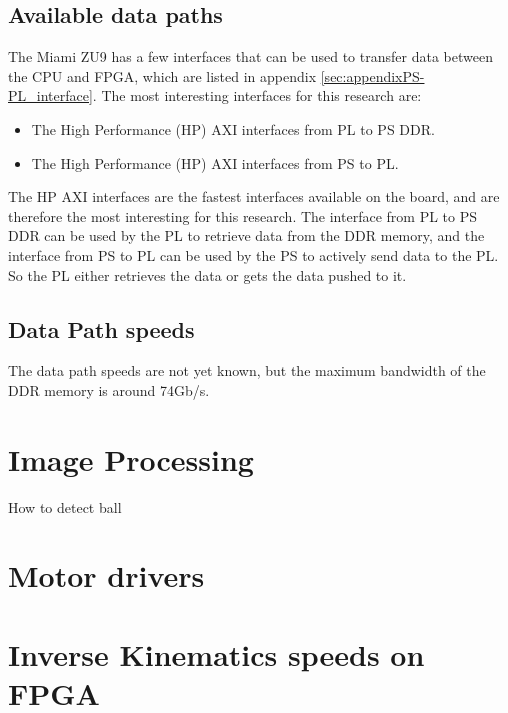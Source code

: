 \documentclass{article}
\begin{document}
\subsection{Available data paths}
The Miami ZU9 has a few interfaces that can be used to transfer data between the CPU and FPGA, which are listed in appendix \ref{sec:appendixPS-PL_interface}.
The most interesting interfaces for this research are:
\begin{itemize}
    \item The High Performance (HP) AXI interfaces from PL to PS DDR.
    \item The High Performance (HP) AXI interfaces from PS to PL.
\end{itemize}
The HP AXI interfaces are the fastest interfaces available on the board, and are therefore the most interesting for this research. 
The interface from PL to PS DDR can be used by the PL to retrieve data from the DDR memory, and the interface from PS to PL can be used by the PS to actively send data to the PL.
So the PL either retrieves the data or gets the data pushed to it.

\subsection{Data Path speeds}
The data path speeds are not yet known, but the maximum bandwidth of the DDR memory is around 74Gb/s.



\newpage

\section{Image Processing}
How to detect ball

\section{Motor drivers}

\section{Inverse Kinematics speeds on FPGA}
\end{document}
